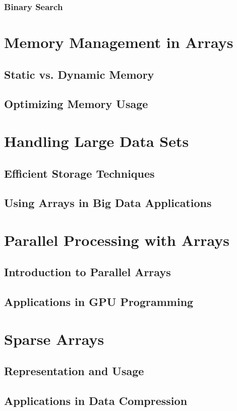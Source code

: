 \documentclass[12pt, oneside]{book}
\begin{document}
	\subsubsection{Binary Search}
	
	\section{Memory Management in Arrays}
	\subsection{Static vs. Dynamic Memory}
	\subsection{Optimizing Memory Usage}
	
	\section{Handling Large Data Sets}
	\subsection{Efficient Storage Techniques}
	\subsection{Using Arrays in Big Data Applications}
	
	\section{Parallel Processing with Arrays}
	\subsection{Introduction to Parallel Arrays}
	\subsection{Applications in GPU Programming}
	
	\section{Sparse Arrays}
	\subsection{Representation and Usage}
	\subsection{Applications in Data Compression}
\end{document}
